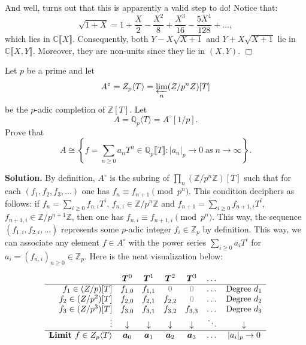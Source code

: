 \documentclass{template}
\newcommand{\qedwhite}{\hfill \ensuremath{\Box}}
\begin{document}
And well, turns out that this is apparently a valid step to do! Notice that:
\begin{equation*}
    \sqrt{1+X} = 1 + \frac{X}{2} - \frac{X^2}{8} + \frac{X^3}{16} - \frac{5X^4}{128} + \dots,
\end{equation*}
which lies in $\mathbb{C}\lBrack X \rBrack$. Consequently, both
$Y-X\sqrt{X+1}$ and $Y+X\sqrt{X+1}$ lie in $\mathbb{C}\lBrack X,Y \rBrack$.
Moreover, they are non-units since they lie in $(X,Y)$. \qedwhite

\begin{problem}[Exercise 6]
    Let $p$ be a prime and let 
    \begin{equation*}
        A^{\circ} = \mathbb{Z}_p \langle T \rangle = \varprojlim_{n} (\mathbb{Z}/p^n\mathbb{Z})[T]
    \end{equation*}
    be the $p$-adic completion of $\mathbb{Z}[T]$. Let
    \begin{equation*}
        A = \mathbb{Q}_p\langle T \rangle = A^{\circ}[1/p].
    \end{equation*}
    Prove that
    \begin{equation*}
        A \cong \left\{ f = \sum_{n \geq 0}a_nT^n \in \mathbb{Q}_p\lBrack T \rBrack: |a_n|_p \to 0 \; \text{as} \; n \to \infty \right\}.
    \end{equation*}
\end{problem}

\textbf{Solution.} By definition, $A^{\circ}$ is the subring of $\prod_n
(\mathbb{Z}/p^n\mathbb{Z})[T]$ such that for each $(f_1,f_2,f_3,\dots)$ one has
$f_n \equiv f_{n+1} \pmod{p^n}$. This condition deciphers as follows: if $f_n =
\sum_{i \geq 0}f_{n,i}T^i$, $f_{n,i} \in \mathbb{Z}/p^n\mathbb{Z}$ and $f_{n+1}
= \sum_{i \geq 0}f_{n+1,i}T^i$, $f_{n+1,i} \in \mathbb{Z}/p^{n+1}\mathbb{Z}$,
then one has $f_{n,i} \equiv f_{n+1,i} \pmod{p^n}$. This way, the sequence
$(f_{1,i},f_{2,i},\dots)$ represents some $p$-adic integer $f_i \in
\mathbb{Z}_p$ by definition. This way, we can associate any element $f \in
A^{\circ}$ with the power series $\sum_{i \geq 0}a_iT^i$ for $a_i = (f_{n,i})_{n
\geq 0} \in \mathbb{Z}_p$. Here is the neat visualization below:

\[
\begin{array}{rcccccc}
 & \bm{T}^0 & \bm{T}^1 & \bm{T}^2 & \bm{T}^3 & \dots &  \\
\hline
f_1 \in (\mathbb{Z}/p)[T] & f_{1,0} & f_{1,1} & \color{gray}{0} & \color{gray}{0} & \dots & \text{Degree } d_1 \\
f_2 \in (\mathbb{Z}/p^2)[T] & f_{2,0} & f_{2,1} & f_{2,2} & \color{gray}{0} & \dots & \text{Degree } d_2 \\
f_3 \in (\mathbb{Z}/p^3)[T] & f_{3,0} & f_{3,1} & f_{3,2} & f_{3,3} & \dots & \text{Degree } d_3 \\
\vdots & \downarrow & \downarrow & \downarrow & \downarrow & \ddots & \downarrow \\
\hline
\textbf{Limit } f \in \mathbb{Z}_p\langle T \rangle & \bm{a}_0 & \bm{a}_1 & \bm{a}_2 & \bm{a}_3 & \dots & |a_i|_p \to 0
\end{array}
\]
\end{document}
